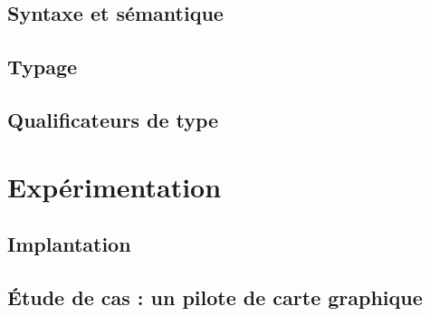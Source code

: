 \documentclass[a4paper,11pt]{memoir}
\begin{document}


\chapter{Syntaxe et sémantique}

\label{cha:lang}


\chapter{Typage}

\label{cha:typbase}



%

\chapter{Qualificateurs de type}

\label{cha:qualifs}



%



\part{Expérimentation}
\label{part:xp}



\chapter{Implantation}

\label{cha:implem}


\chapter{Étude de cas : un pilote de carte graphique}
\end{document}
